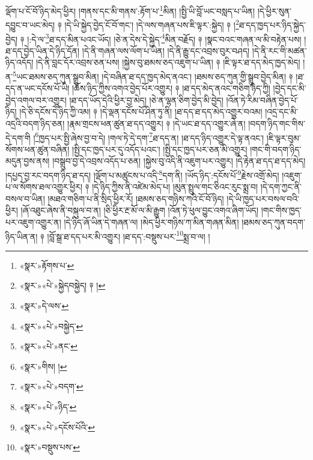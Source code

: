 ལྡོག་པ་ངོ་བོ་ཉིད་མེད་ཕྱིར། །གནས་དང་མི་གནས་:རྟོག་པ་\footnote{«སྣར་»རྟོགས་པ་}མིན། །སྤྱི་ཡི་བློ་ཡང་བསླད་པ་ཡིན། །དེ་ཕྱིར་སུན་དབྱུང་བ་ཡང་མེད། ༈ །དེ་ཡི་སྐྱེད་བྱེད་ངོ་བོ་གང་། །དེ་ལས་གཞན་པས་ཇི་ལྟར་:སྐྱེད། ༈ །\footnote{«སྣར་»«པེ་»སྐྱེདབསྐྱེད། ༈ །}ཐ་དད་ཁྱད་པར་ཉིད་སྐྱེད་བྱེད། ༈ །:དེ་ལ་\footnote{«སྣར་»དེ་ལས་}ཐ་དད་མིན་པའང་ཡོད། །ཅེ་ན་དེས་དེ་སྐྱེད་\footnote{«སྣར་»«པེ་»བསྐྱེད་}མིན་བརྗོད། ༈ །སྣང་བའང་གཞན་ལ་མི་བརྟེན་པས། །ཐ་དད་བྱེད་ཡིན་དེ་ཉིད་དོན། །དེ་ནི་གཞན་ལས་ལོག་པ་ཡིན། །དེ་ནི་རྒྱུ་དང་འབྲས་བུར་བཤད། །དེ་ནི་རང་གི་མཚན་ཉིད་འདོད། །དེ་ནི་བླང་དོར་འབྲས་ཅན་པས། །སྐྱེས་བུ་ཐམས་ཅད་འཇུག་པ་ཡིན། ༈ །ཇི་ལྟར་ཐ་དད་མེད་ཁྱད་མེད། །ན་\footnote{«སྣར་»«པེ་»ནང་}ཡང་ཐམས་ཅད་ཀུན་སྒྲུབ་མིན། །དེ་བཞིན་ཐ་དད་ཁྱད་མེད་ནའང་། །ཐམས་ཅད་ཀུན་གྱི་སྒྲུབ་བྱེད་མིན། ༈ །ཐ་དད་ན་ཡང་དངོས་པོ་ཡི། །ཆོས་ཉིད་ཀྱིས་འགའ་བྱེད་པོར་འགྱུར། ༈ །ཐ་དད་མེད་ནའང་གཅིག་ཉིད་ཀྱི། །བྱེད་དང་མི་བྱེད་འགལ་བར་འགྱུར། །ཐ་དད་ཡོད་དེའི་ཕྱིར་བྱ་མེད། །ཅེ་ན་ལྷན་ཅིག་བྱེད་མི་བྱེད། །འོན་ཏེ་རིམ་བཞིན་བྱེད་པོ་ཉིད། །དེ་ཅི་དངོས་དེ་ཉིད་ཀྱི་འམ། ༈ །དེ་ལྡན་དངོས་པོ་ཤིན་ཏུ་ནི། །ཐ་དད་ཐ་དད་མེད་འགྱུར་བའམ། །འདྲ་དང་མི་འདྲའི་བདག་ཉིད་ཅན། །རྣམ་གྲངས་ཕན་ཚུན་ཐ་དད་འགྱུར། ༈ །དེ་ཡང་ཐ་དད་འགྱུར་ཞེ་ན། །བདག་ཉིད་གང་གིས་དེ་དག་གི །\footnote{«སྣར་»གིས། །}ཁྱད་པར་སྤྱི་ཞེས་བྱ་བ་དེ། །གལ་ཏེ་དེ་དག་\footnote{«སྣར་»«པེ་»བདག་}ཐ་དད་ན། །ཐ་དད་ཉིད་འགྱུར་དེ་ལྟ་ནའང་། །ཇི་ལྟར་བུམ་སོགས་ཕན་ཚུན་བཞིན། །སྤྱི་དང་ཁྱད་པར་དུ་འདོད་པའང་། །སྤྱི་དང་ཁྱད་པར་ཅན་མི་འགྱུར། །གང་གི་བདག་ཉིད་མདུན་བྱས་ནས། །བསྒྲུབ་བྱ་དེ་འབྲས་འདོད་པ་ཅན། །སྐྱེས་བུ་འདི་ནི་འཇུག་པར་འགྱུར། །དེ་རྟེན་ཐ་དད་ཐ་དད་མེད། །དཔྱད་བྱ་རང་བདག་ཉིད་ཐ་དད། །ལྡོག་པ་མཚུངས་པ་འདི་\footnote{«སྣར་»«པེ་»ཉིད་}དག་ནི། །ཡོད་ཉིད་:དངོས་པོ་\footnote{«སྣར་»«པེ་»དངོས་པོའི་}རྗེས་འགྲོ་མེད། །འཇུག་པ་ལ་སོགས་ཐལ་འགྱུར་ཕྱིར། ༈ །དེ་ཉིད་ཀྱིས་ནི་འཛེམ་མེད་པ། །མུན་སྤྲུལ་གང་ཅིའང་རུང་སྨྲ་བ། །དེ་དག་ཀྱང་ནི་བསལ་བ་ཡིན། །མཐའ་གཅིག་པ་ནི་སྲིད་ཕྱིར་རོ། །ཐམས་ཅད་གཉིས་ཀའི་ངོ་བོ་ཉིད། །དེ་ཡི་ཁྱད་པར་བསལ་བའི་ཕྱིར། །ཞོ་འཐུང་ཞེས་ནི་བསྐུལ་བ་ན། །ཅི་ཕྱིར་རྔ་མོ་ལ་མི་རྒྱུག །འོན་ཏེ་ཕུལ་བྱུང་འགའ་ཞིག་ཡོད། །གང་གིས་ཁྱད་པར་འཇུག་འགྱུར་ན། །དེ་ཉིད་ཞོ་ཡིན་དེ་གཞན་ལ། །མེད་ཕྱིར་གཉིས་ཀ་མིན་གཞན་མིན། །ཐམས་ཅད་ཀུན་བདག་ཉིད་ཡིན་ན། ༈ །བློ་སྒྲ་ཐ་དད་པར་མི་འགྱུར། །ཐ་དད་:བསྡུས་པར་\footnote{«སྣར་»བསྡུས་པས་}སྨྲ་བ་ལ། །
